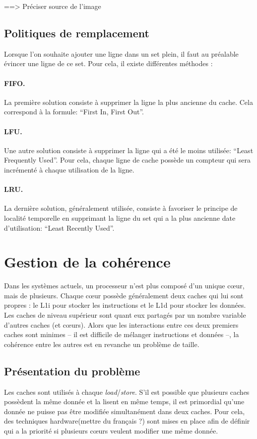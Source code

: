 ==> Préciser source de l'image\\

\subsection{Politiques de remplacement}
\label{remplacement}
 Lorsque l'on souhaite ajouter une ligne dans un set plein, il faut au préalable évincer une ligne de ce set. Pour cela, il existe différentes méthodes :

\paragraph{FIFO.} La première solution consiste à supprimer la ligne la plus ancienne du cache. Cela correspond à la formule: ``First In, First Out''.

\paragraph{LFU.} Une autre solution consiste à supprimer la ligne qui a été le moins utilisée: ``Least Frequently Used''. Pour cela, chaque ligne de cache possède un compteur qui sera incrémenté à chaque utilisation de la ligne. 

\paragraph{LRU.} La dernière solution, généralement utilisée, consiste à favoriser le principe de localité temporelle en supprimant la ligne du set qui a la plus ancienne date d'utilisation: ``Least Recently Used''.

\newpage
\section{Gestion de la cohérence}
Dans les systèmes actuels, un processeur n'est plus composé d'un unique c{\oe}ur, mais de plusieurs. Chaque c{\oe}ur possède généralement deux caches qui lui sont propres : le L1i pour stocker les instructions et le L1d pour stocker les données. Les caches de niveau supérieur sont quant  eux partagés par un nombre variable d'autres caches (et c{\oe}urs). Alors que les interactions entre ces deux premiers caches sont minimes -- il est difficile de mélanger instructions et données --, la cohérence entre les autres est en revanche un problème de taille.

\subsection{Présentation du problème}
Les caches sont utilisés à chaque \textit{load}/\textit{store}. S'il est possible que plusieurs caches possèdent la même donnée et la lisent en même temps, il est primordial qu'une donnée ne puisse pas être modifiée simultanément dans deux caches. Pour cela, des techniques hardware(mettre du français ?) sont mises en place afin de définir qui a la priorité si plusieurs c{\oe}urs veulent modifier une même donnée. \\

